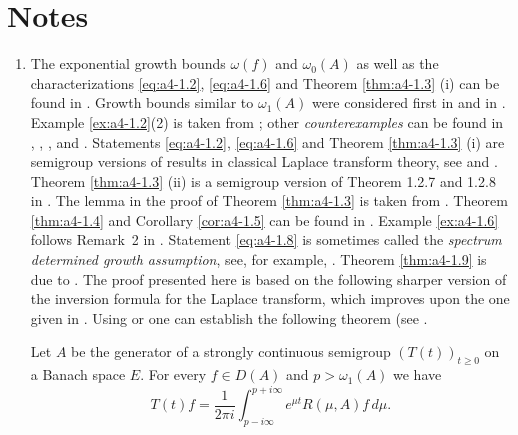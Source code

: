 \section*{Notes}
\begin{enumerate}[%
label={\emph{Section \arabic*:}}
, wide
, labelsep=1em]

\item 
The exponential growth bounds $\omega(f)$ and $\omega_0(A)$ as well as the characterizations \eqref{eq:a4-1.2}, \eqref{eq:a4-1.6} and Theorem \ref{thm:a4-1.3} (i) can be found in \citet{hillephillips:1957}.
Growth bounds similar to $\omega_{1}(A)$ were considered first in \citet{djacenko:1976} and in \citet[Proposition~2]{zabczyk:1979}. 
Example \ref{ex:a4-1.2}(2) is taken from \citet{wolff:1981}; other \emph{counterexamples} can be found in \citet{hillephillips:1957}, \citet{foias:1973}, \citet{triggiani:1975}, 
\citet{zabczyk:1975} and \citet{greineretal:1981}. 
Statements \eqref{eq:a4-1.2}, \eqref{eq:a4-1.6} and Theorem \ref{thm:a4-1.3} (i) are semigroup versions of results in classical Laplace transform theory, see \citet{hillephillips:1957} and \citet{widder:1946}. 
Theorem \ref{thm:a4-1.3} (ii) is a semigroup version of Theorem 1.2.7 and 1.2.8 in \citet{doetsch:1950}. 
The lemma in the proof of Theorem \ref{thm:a4-1.3} is taken from \citet{milstein:1975}. 
Theorem \ref{thm:a4-1.4} and Corollary \ref{cor:a4-1.5} can be found in \citet{neubrander:1985a}. 
Example \ref{ex:a4-1.6} follows Remark~2 in \citet{zabczyk:1975}. 
Statement \eqref{eq:a4-1.8} is sometimes called the \emph{spectrum determined growth assumption}, see, for example, \citet{triggiani:1975b}. 
Theorem \ref{thm:a4-1.9} is due to \citet{slemrod:1976}. 
The proof presented here is based on the following sharper version of the inversion formula for the Laplace transform, which improves upon the one given in \citet[p.349]{hillephillips:1957}. 
Using \citet[p.66]{widder:1946} or \citet[p.212]{doetsch:1950} one can establish the following theorem (see \citet{neubrander:1984b}.

\begin{theorem}\label{thm:a4-2.6}
Let $A$ be the generator of a strongly continuous semigroup $(T(t))_{t \geq 0}$ on a Banach space $E$. 
For every $f \in D(A)$ and $p > \omega_{1}(A)$ we have
\[
T(t)f = \frac{1}{2\pi i} \int_{p-i\infty}^{p+i\infty} e^{\mu t}R(\mu,A)f \, d\mu.
\]
\end{theorem}


\end{enumerate}
